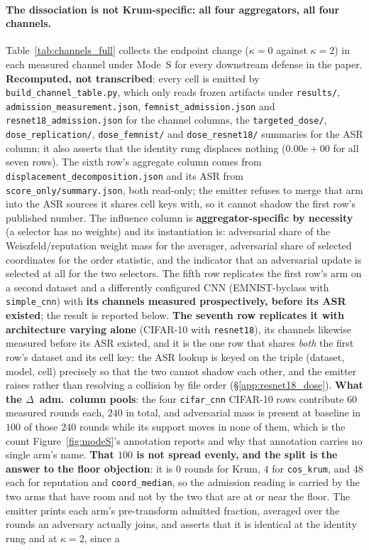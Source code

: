 \documentclass{article}
\begin{document}
\paragraph{The dissociation is not Krum-specific: all four aggregators, all four channels.} Table~\ref{tab:channels_full} collects the endpoint change ($\kappa{=}0$ against $\kappa{=}2$) in each measured channel under Mode~S for every downstream defense in the paper. \textbf{Recomputed, not transcribed}: every cell is emitted by \texttt{build\_channel\_table.py}, which only reads frozen artifacts under \texttt{results/}, \texttt{admission\_\allowbreak measurement.json}, \texttt{femnist\_\allowbreak admission.json} and \texttt{resnet18\_\allowbreak admission.json} for the channel columns, the \texttt{targeted\_dose/}, \texttt{dose\_\allowbreak replication/}, \texttt{dose\_femnist/} and \texttt{dose\_\allowbreak resnet18/} summaries for the ASR column; it also asserts that the identity rung displaces nothing ($0.00\mathrm{e}{+}00$ for all seven rows). The sixth row's aggregate column comes from \texttt{displacement\_\allowbreak decomposition.json} and its ASR from \texttt{score\_only/summary.json}, both read-only; the emitter refuses to merge that arm into the ASR sources it shares cell keys with, so it cannot shadow the first row's published number. The influence column is \textbf{aggregator-specific by necessity} (a selector has no weights) and its instantiation is: adversarial share of the Weiszfeld/reputation weight mass for the averager, adversarial share of selected coordinates for the order statistic, and the indicator that an adversarial update is selected at all for the two selectors. The fifth row replicates the first row's arm on a second dataset and a differently configured CNN (EMNIST-byclass with \texttt{simple\_cnn}) with \textbf{its channels measured prospectively, before its ASR existed}; the result is reported below. \textbf{The seventh row replicates it with architecture varying alone} (CIFAR-10 with \texttt{resnet18}), its channels likewise measured before its ASR existed, and it is the one row that shares \emph{both} the first row's dataset and its cell key: the ASR lookup is keyed on the triple (dataset, model, cell) precisely so that the two cannot shadow each other, and the emitter raises rather than resolving a collision by file order (§\ref{app:resnet18_dose}). \textbf{What the $\Delta$~adm.\ column pools}: the four \texttt{cifar\_cnn} CIFAR-10 rows contribute $60$ measured rounds each, $240$ in total, and adversarial mass is present at baseline in $100$ of those $240$ rounds while its support moves in none of them, which is the count Figure~\ref{fig:modeS}'s annotation reports and why that annotation carries no single arm's name. \textbf{That $100$ is not spread evenly, and the split is the answer to the floor objection}: it is $0$ rounds for Krum, $4$ for \texttt{cos\_krum}, and $48$ each for reputation and \texttt{coord\_median}, so the admission reading is carried by the two arms that have room and not by the two that are at or near the floor. The emitter prints each arm's pre-transform admitted fraction, averaged over the rounds an adversary actually joins, and asserts that it is identical at the identity rung and at $\kappa{=}2$, since a 
\end{document}
